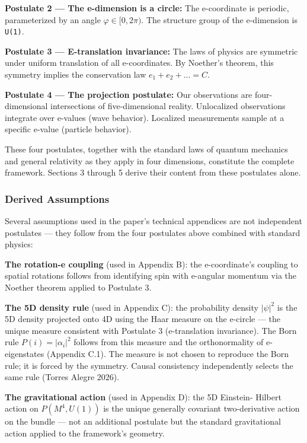 \documentclass[aps,prd,preprint,superscriptaddress,longbibliography,floatfix]{revtex4-2}
\theoremstyle{remark}
\begin{document}
\textbf{Postulate 2 --- The e-dimension is a circle:} The e-coordinate is periodic, parameterized by an angle $\varphi \in [0, 2\pi)$. The structure group of the e-dimension is \texttt{U(1)}.

\textbf{Postulate 3 --- E-translation invariance:} The laws of physics are symmetric under uniform translation of all e-coordinates. By Noether's theorem, this symmetry implies the conservation law $e_{1} + e_{2} + ... = C$.

\textbf{Postulate 4 --- The projection postulate:} Our observations are four-dimensional intersections of five-dimensional reality. Unlocalized observations integrate over e-values (wave behavior). Localized measurements sample at a specific e-value (particle behavior).

These four postulates, together with the standard laws of quantum mechanics and general relativity as they apply in four dimensions, constitute the complete framework. Sections 3 through 5 derive their content from these postulates alone.


\subsubsection{Derived Assumptions}

Several assumptions used in the paper's technical appendices are not independent postulates --- they follow from the four postulates above combined with standard physics:

\textbf{The rotation-e coupling} (used in Appendix B): the e-coordinate's coupling to spatial rotations follows from identifying spin with e-angular momentum via the Noether theorem applied to Postulate 3.

\textbf{The 5D density rule} (used in Appendix C): the probability density $|\psi|^{2}$ is the 5D density projected onto 4D using the Haar measure on the e-circle --- the unique measure consistent with Postulate 3 (e-translation invariance). The Born rule $P(i) = |\alpha_{i}|^{2}$ follows from this measure and the orthonormality of e-eigenstates (Appendix C.1). The measure is not chosen to reproduce the Born rule; it is forced by the symmetry. Causal consistency independently selects the same rule (Torres Alegre 2026).

\textbf{The gravitational action} (used in Appendix D): the 5D Einstein- Hilbert action on $P(M^{4}, U(1))$ is the unique generally covariant two-derivative action on the bundle --- not an additional postulate but the standard gravitational action applied to the framework's geometry.
\end{document}
